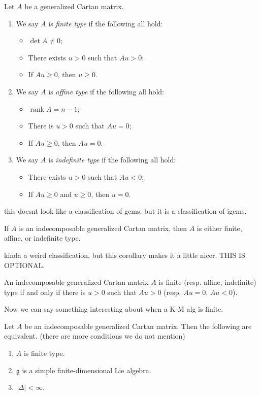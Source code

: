 \documentclass[11pt, letterpaper]{article}
\theoremstyle{plain}
\begin{document}
\begin{definition}\label{dfn:6-9}
	Let $A$ be a generalized Cartan matrix.
	\begin{enumerate}
		\item We say $A$ is \emph{finite type} if the following all hold:
			\begin{itemize}
				\item $\det A \neq 0$;
				\item There exists $u > 0$ such that $Au > 0$;
				\item If $Au \geq 0$, then $u\geq 0$.
			\end{itemize}
		\item We say $A$ is \emph{affine type} if the following all hold:
			\begin{itemize}
				\item $\operatorname{rank} A = n-1$;
				\item There is $u>0$ such that $Au=0$;
				\item If $Au \geq 0$, then $Au=0$.
			\end{itemize}
		\item We say $A$ is \emph{indefinite type} if the following all hold:
			\begin{itemize}
				\item There exists $u>0$ such that $Au<0$;
				\item If $Au\geq 0$ and $u\geq 0$, then $u=0$.
			\end{itemize}
	\end{enumerate}
\end{definition}

this doesnt look like a classification of gcms, but it is a classification of igcms.

\begin{proposition}\label{prp:6-10}
	If $A$ is an indecomposable generalized Cartan matrix, then $A$ is either finite, affine, or indefinite type.
\end{proposition}

kinda a weird classification, but this corollary makes it a little nicer. THIS IS OPTIONAL.

\begin{corollary}\label{cor:6-11}
	An indecomposable generalized Cartan matrix $A$ is finite (resp. affine, indefinite) type if and only if there is $u>0$ such that $Au>0$ (resp. $Au=0$, $Au<0$).
\end{corollary}

Now we can say something interesting about when a K-M alg is finite.
\begin{proposition}\label{prp:6-12}
	Let $A$ be an indecomposable generalized Cartan matrix. Then the following are equivalent. (there are more conditions we do not mention)
	\begin{enumerate}
		\item $A$ is finite type.
		\item $\mathfrak{g} $ is a simple finite-dimensional Lie algebra.
		\item $\left| \Delta  \right| <\infty $.
	\end{enumerate}
\end{proposition}
\end{document}
